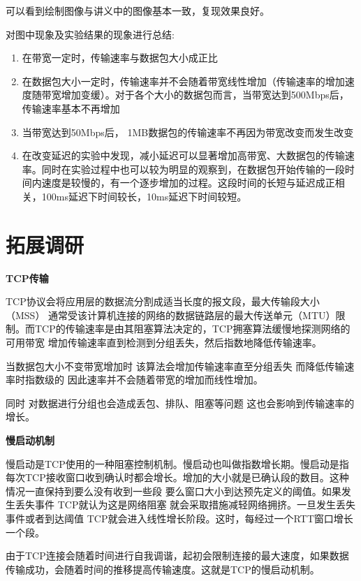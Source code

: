 \documentclass[11pt]{article}
\begin{document}
可以看到绘制图像与讲义中的图像基本一致，复现效果良好。

\vspace{2em}

对图中现象及实验结果的现象进行总结:
\begin{enumerate}
  \item 在带宽一定时，传输速率与数据包大小成正比
  \item 在数据包大小一定时，传输速率并不会随着带宽线性增加（传输速率的增加速度随带宽增加变缓）。对于各个大小的数据包而言，当带宽达到500Mbps后，传输速率基本不再增加
  \item 当带宽达到50Mbps后， 1MB数据包的传输速率不再因为带宽改变而发生改变
  \item 在改变延迟的实验中发现，减小延迟可以显著增加高带宽、大数据包的传输速率。同时在实验过程中也可以较为明显的观察到，在数据包开始传输的一段时间内速度是较慢的，有一个逐步增加的过程。这段时间的长短与延迟成正相关，100ms延迟下时间较长，10ms延迟下时间较短。
\end{enumerate}


\section{拓展调研}


\textbf{TCP传输}

TCP协议会将应用层的数据流分割成适当长度的报文段，最大传输段大小（MSS） 通常受该计算机连接的网络的数据链路层的最大传送单元（MTU）限制。而TCP的传输速率是由其阻塞算法决定的，TCP拥塞算法缓慢地探测网络的可用带宽 增加传输速率直到检测到分组丢失，然后指数地降低传输速率。

当数据包大小不变带宽增加时 该算法会增加传输速率直至分组丢失 而降低传输速率时指数级的 因此速率并不会随着带宽的增加而线性增加。

同时 对数据进行分组也会造成丢包、排队、阻塞等问题 这也会影响到传输速率的增长。


\vspace{2em}
\textbf{慢启动机制}

慢启动是TCP使用的一种阻塞控制机制。慢启动也叫做指数增长期。慢启动是指每次TCP接收窗口收到确认时都会增长。增加的大小就是已确认段的数目。这种情况一直保持到要么没有收到一些段 要么窗口大小到达预先定义的阈值。如果发生丢失事件 TCP就认为这是网络阻塞 就会采取措施减轻网络拥挤。一旦发生丢失事件或者到达阈值 TCP就会进入线性增长阶段。这时，每经过一个RTT窗口增长一个段。

由于TCP连接会随着时间进行自我调谐，起初会限制连接的最大速度，如果数据传输成功，会随着时间的推移提高传输速度。这就是TCP的慢启动机制。
\end{document}
